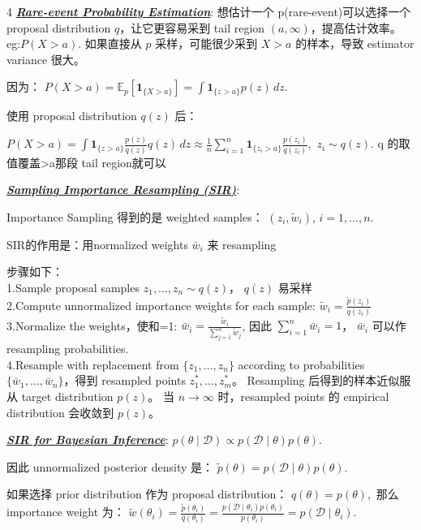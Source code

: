 \documentclass[12pt]{article}
\newcommand{\bulletPoint}[1]{\underline{\textit{\textbf{#1}}}}
\begin{document}
\begin{multicols*}{4}
\bulletPoint{Rare-event Probability Estimation}:
想估计一个 p(rare-event)可以选择一个 proposal distribution $q$，让它更容易采到 tail region $(a,\infty)$，提高估计效率。
 eg:$P(X>a).$
如果直接从 $p$ 采样，可能很少采到 $X>a$ 的样本，导致 estimator variance 很大。

因为：
$
P(X>a)
=
\mathbb E_p\left[
\mathbf 1_{\{X>a\}}
\right]
=
\int \mathbf 1_{\{z>a\}}p(z)\,dz.
$

使用 proposal distribution $q(z)$ 后：


$
P(X>a)
=
\int
\mathbf 1_{\{z>a\}}
\frac{p(z)}{q(z)}
q(z)\,dz
\approx
\frac{1}{n}
\sum_{i=1}^n
\mathbf 1_{\{z_i>a\}}
\frac{p(z_i)}{q(z_i)},
$
$
z_i\sim q(z).
$
q 的取值覆盖>a那段 tail region就可以


\bulletPoint{Sampling Importance Resampling (SIR)}:

Importance Sampling 得到的是 weighted samples：
$
(z_i,\tilde w_i)$,
$i=1,\dots,n$.

SIR的作用是：用normalized weights $\bar w_i$ 来 resampling 

步骤如下：\\
1.Sample proposal samples $z_1,\dots,z_n\sim q(z)$， $q(z)$ 易采样\\
2.Compute unnormalized importance weights for each sample:
$\tilde w_i=\frac{\tilde p(z_i)}{q(z_i)}$\\
3.Normalize the weights，使和=1:
$\bar w_i=
\frac{\tilde w_i}
{\sum_{j=1}^n \tilde w_j}$,
因此 $\sum_{i=1}^n \bar w_i=1$， $\bar w_i$ 可以作 resampling probabilities.\\
4.Resample with replacement from 
$\{z_1,\dots,z_n\}$
according to probabilities 
$\{\bar w_1,\dots,\bar w_n\}$，得到 resampled points
$z_1^*,\dots,z_m^*$。
Resampling 后得到的样本近似服从 target distribution $p(z)$。
当 $n\to\infty$ 时，resampled points 的 empirical distribution 会收敛到 $p(z)$。


\bulletPoint{SIR for Bayesian Inference}:
$
p(\theta\mid \mathcal D)
\propto
p(\mathcal D\mid \theta)p(\theta).
$

因此 unnormalized posterior density 是：
$
\tilde p(\theta)
=
p(\mathcal D\mid \theta)p(\theta).
$

如果选择 prior distribution 作为 proposal distribution：
$
q(\theta)=p(\theta),
$
那么 importance weight 为：
$
\tilde w(\theta_i)
=
\frac{
\tilde p(\theta_i)
}{
q(\theta_i)
}
=
\frac{
p(\mathcal D\mid \theta_i)p(\theta_i)
}{
p(\theta_i)
}=
p(\mathcal D\mid \theta_i).
$


\end{multicols*}
\end{document}
